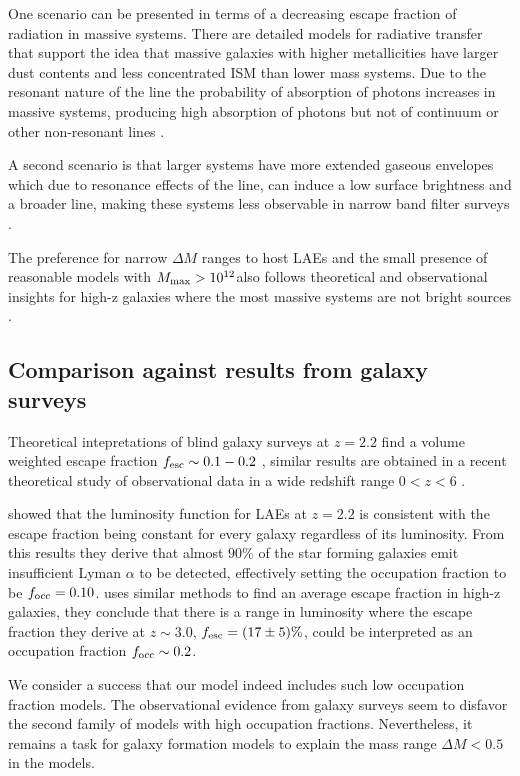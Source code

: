 \documentclass[usenatbib]{mn2e}
\newcommand{\ly}{{\ifmmode{{\rm Ly}\alpha}\else{Ly$\alpha$~}\fi}}
\newcommand{\hMsun}{{\ifmmode{h^{-1}{\rm
        {M_{\odot}}}}\else{$h^{-1}{\rm{M_{\odot}}}$}\fi}}
\begin{document}
One scenario can be presented in terms of a decreasing escape fraction
of \ly radiation in massive systems. There are detailed models for
radiative transfer that support the idea that massive galaxies with
higher metallicities have larger dust contents and less concentrated
ISM than lower mass systems. Due to the resonant nature of the \ly
line the probability of absorption  of \ly photons increases in
massive systems, producing high absorption of \ly photons but not of
continuum or other non-resonant lines \citep{Laursen2009,ForeroRomero2011}. 

A second scenario is that larger systems have more extended gaseous
envelopes which due to resonance effects of the \ly line, can induce a
low surface brightness and a broader line, making these systems less
observable in narrow band filter surveys
\citep{Laursen2009,Zheng2010}.   

The preference for narrow $\Delta M$ ranges to host LAEs 
and the small presence of reasonable models with $M_{\rm max}>
10^{12}$\hMsun also follows theoretical and observational
insights for high-z galaxies where the most massive systems are not
bright \ly sources \citep{ForeroRomero2012,Shapley2003}. 

\subsection{Comparison against results from galaxy surveys}

Theoretical intepretations of blind galaxy surveys at $z=2.2$ find a
volume weighted escape fraction $f_{\rm esc}\sim 0.1-0.2$
\cite{Hayes2010}, similar results are obtained in a recent theoretical
study of observational data in a wide redshift range $0<z<6$
\citep{Dijkstra2013}. 


\cite{Hayes2010} showed that the luminosity function for
LAEs at $z=2.2$ is consistent with the escape fraction being constant
for every galaxy regardless of its luminosity. From this results they
derive that almost $90\%$ of the star forming galaxies emit insufficient
Lyman $\alpha$ to be detected, effectively setting the occupation
fraction to be $f_{\rm occ}=0.10$. \cite{Dijkstra2013} uses similar
methods to find an average \ly escape fraction in high-z galaxies,
they conclude that there is a range in luminosity where the escape
fraction they derive at $z\sim 3.0$, $f_{\rm esc}=(17\pm 5)\%$, could
be interpreted as an occupation fraction $f_{\rm occ}\sim 0.2$.  

We consider a success that our model indeed includes such low
occupation fraction models. The observational evidence from galaxy
surveys seem to disfavor the second family of models with high
occupation fractions. Nevertheless, it remains a task for galaxy
formation models to explain the mass range $\Delta M<0.5$ in the models.
\end{document}
